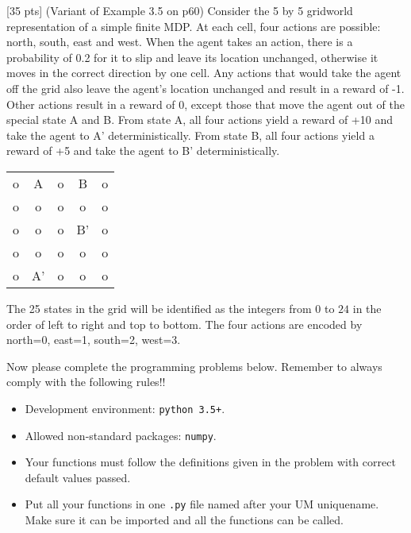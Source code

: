 
 [35 pts] (Variant of Example 3.5 on p60)
Consider the 5 by 5 gridworld representation of
a simple finite MDP. At each cell, four actions are possible: north, south, east
and west. When the agent takes an action, there is a probability of 0.2 for it
to slip and leave its location unchanged, otherwise it moves in the correct
direction by one cell. Any actions that would take the agent off the grid
also leave the agent's location unchanged and result in a reward of -1.
Other actions result in a reward of 0, except those that move the agent out
of the special state A and B. From state A, all four actions yield a reward of
+10 and take the agent to A' deterministically. From state B, all four actions
yield a reward of +5 and take the agent to B' deterministically.
\begin{center}
    \begin{tabular}{ccccc}
      o & A  & o & B  & o\\
      o & o  & o & o  & o\\
      o & o  & o & B' & o\\
      o & o  & o & o  & o\\
      o & A' & o & o  & o\\
    \end{tabular}
\end{center}
The 25 states in the grid will be identified as the integers
from $ 0 $ to $ 24 $ in the order of left to right and top to bottom.
The four actions are encoded by north=0, east=1, south=2, west=3.

Now please complete the programming problems below. Remember to always comply with
the following rules!!
\begin{itemize}
  \item Development environment: \texttt{python 3.5+}.
  \item Allowed non-standard packages: \texttt{numpy}.
  \item Your functions must follow the definitions given in the
  problem with correct default values passed.
  \item Put all your functions in one \texttt{.py} file named after your UM
  uniquename. Make sure it can be imported and all the functions can be
  called.
\end{itemize}

